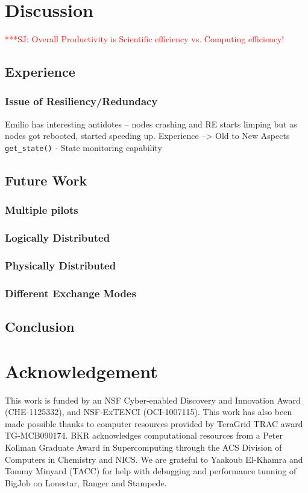 \documentclass{sig-alternate}
\newcommand{\jhanote}[1]{ {\textcolor{red} { ***SJ: #1 }}}
\newcommand{\jhanote}[1]{}
\begin{document}
\section{Discussion}

\jhanote{Overall Productivity is Scientific efficiency vs. Computing
  efficiency!}

\subsection{Experience}

\subsubsection{Issue of Resiliency/Redundacy} Emilio has interesting
antidotes -- nodes crashing and RE starts limping but as nodes got
rebooted, started speeding up.  Experience --> Old to New Aspects
\texttt{get\_state()} - State monitoring capability


\subsection{Future Work}

\subsubsection{Multiple pilots}

\subsubsection{Logically Distributed}
\subsubsection{Physically Distributed}

\subsubsection{Different Exchange Modes}


\subsection{Conclusion}

\section*{Acknowledgement} {\footnotesize This work is funded by an
  NSF Cyber-enabled Discovery and Innovation Award (CHE-1125332), and
  NSF-ExTENCI (OCI-1007115). This work has also been made possible
  thanks to computer resources provided by TeraGrid TRAC award
  TG-MCB090174.  BKR acknowledges computational resources from a 
  Peter Kollman Graduate Award in Supercomputing through the ACS Division of 
  Computers in Chemistry and NICS. We are grateful to Yaakoub
  El-Khamra and Tommy Minyard (TACC) for help with debugging and
  performance tunning of BigJob on Lonestar, Ranger and Stampede.}


%
%

\end{document}
